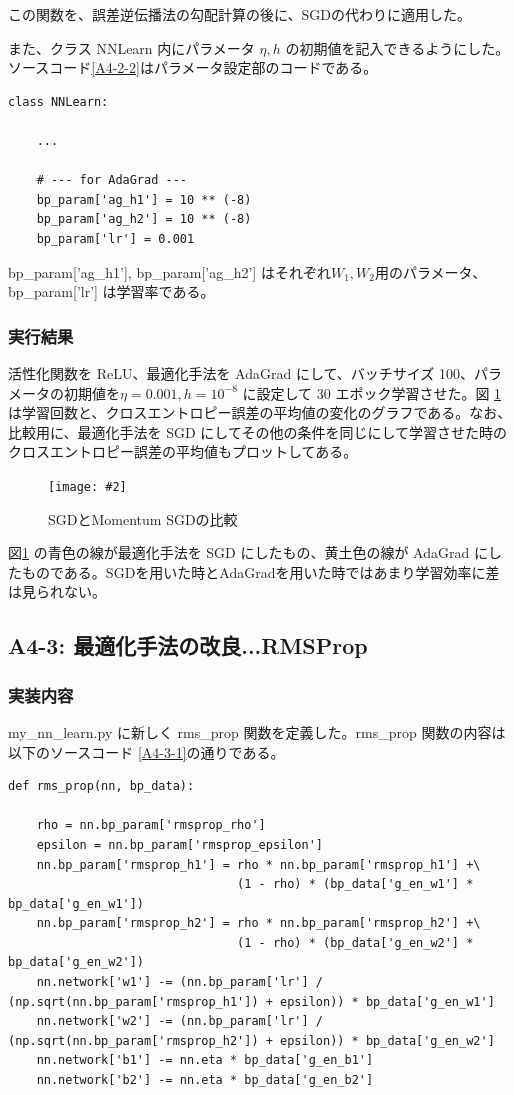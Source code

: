\documentclass[a4paper,dvipdfmx]{jsarticle}
\newcommand{\image}[3]{
    \begin{figure}[H]
        \begin{center}
        \texttt{[image: \#2]}
        \end{center}
        \caption{#1}
        \label{#3}
    \end{figure}
}
\begin{document}
この関数を、誤差逆伝播法の勾配計算の後に、SGDの代わりに適用した。

また、クラス NNLearn 内にパラメータ $\eta, h$ の初期値を記入できるようにした。ソースコード\ref{A4-2-2}はパラメータ設定部のコードである。
\begin{lstlisting}[caption="AdaGrad のパラメータ設定部",label=A4-2-2]
class NNLearn:

	...
	
    # --- for AdaGrad ---
    bp_param['ag_h1'] = 10 ** (-8)
    bp_param['ag_h2'] = 10 ** (-8)
    bp_param['lr'] = 0.001
\end{lstlisting}

bp\_param['ag\_h1'], bp\_param['ag\_h2'] はそれぞれ$W_1, W_2$用のパラメータ、bp\_param['lr'] は学習率である。

\subsubsection*{実行結果}

活性化関数を ReLU、最適化手法を AdaGrad にして、バッチサイズ 100、パラメータの初期値を$\eta = 0.001, h = 10^{-8}$ に設定して 30 エポック学習させた。図 \ref{fig-A4-2-1} は学習回数と、クロスエントロピー誤差の平均値の変化のグラフである。なお、比較用に、最適化手法を SGD にしてその他の条件を同じにして学習させた時のクロスエントロピー誤差の平均値もプロットしてある。

\image{SGDとMomentum SGDの比較}{report_a4-2.png}{fig-A4-2-1}

図\ref{fig-A4-2-1} の青色の線が最適化手法を SGD にしたもの、黄土色の線が AdaGrad にしたものである。SGDを用いた時とAdaGradを用いた時ではあまり学習効率に差は見られない。

\subsection*{A4-3: 最適化手法の改良...RMSProp}

\subsubsection*{実装内容}
my\_nn\_learn.py に新しく rms\_prop 関数を定義した。rms\_prop 関数の内容は以下のソースコード \ref{A4-3-1}の通りである。
\begin{lstlisting}[caption="RMSProp",label=A4-3-1]
def rms_prop(nn, bp_data):

    rho = nn.bp_param['rmsprop_rho']
    epsilon = nn.bp_param['rmsprop_epsilon']
    nn.bp_param['rmsprop_h1'] = rho * nn.bp_param['rmsprop_h1'] +\
                                (1 - rho) * (bp_data['g_en_w1'] * bp_data['g_en_w1'])
    nn.bp_param['rmsprop_h2'] = rho * nn.bp_param['rmsprop_h2'] +\
                                (1 - rho) * (bp_data['g_en_w2'] * bp_data['g_en_w2'])
    nn.network['w1'] -= (nn.bp_param['lr'] / (np.sqrt(nn.bp_param['rmsprop_h1']) + epsilon)) * bp_data['g_en_w1']
    nn.network['w2'] -= (nn.bp_param['lr'] / (np.sqrt(nn.bp_param['rmsprop_h2']) + epsilon)) * bp_data['g_en_w2']
    nn.network['b1'] -= nn.eta * bp_data['g_en_b1']
    nn.network['b2'] -= nn.eta * bp_data['g_en_b2']
\end{lstlisting}
\end{document}
